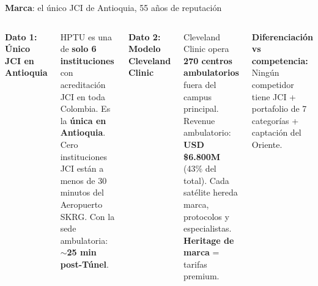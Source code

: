\documentclass[aspectratio=169, 12pt]{beamer}
\newcommand{\eqvar}[2]{\textcolor{#1}{\textbf{#2}}}
\begin{document}
\begin{frame}{\eqvar{marca}{Marca}: el único JCI de Antioquia, 55 años de reputación}

\begin{columns}[T]
\vspace{-2pt}

{\footnotesize\textbf{Dato 1: Único JCI en Antioquia}}

\vspace{4pt}
{\scriptsize
HPTU es una de \textbf{solo 6 instituciones} con acreditación JCI en toda Colombia. Es la \textcolor{marca}{\textbf{única en Antioquia}}. Cero instituciones JCI están a menos de 30 minutos del Aeropuerto SKRG. Con la sede ambulatoria: \textbf{$\sim$25 min post-Túnel}.
}

\vspace{8pt}
{\footnotesize\textbf{Dato 2: Modelo Cleveland Clinic}}

\vspace{4pt}
{\scriptsize
Cleveland Clinic opera \textbf{270 centros ambulatorios} fuera del campus principal. Revenue ambulatorio: \textbf{USD \$6.800M} (43\% del total). Cada satélite hereda marca, protocolos y especialistas. \textcolor{marca}{\textbf{Heritage de marca}} = tarifas premium.
}

\vspace{4pt}

\vspace{6pt}
{\scriptsize\textcolor{marca}{\textbf{Diferenciación vs competencia:}}\\
Ningún competidor tiene JCI + portafolio de 7 categorías + captación del Oriente.}
\end{columns}
\end{frame}
\end{document}
